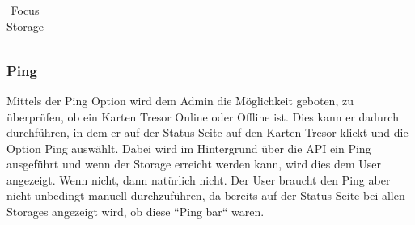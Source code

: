 \begin{table}[htbp]
\begin{tabular}{cc}
  \end{tabular}
  \label{tab:example}
  \captionsetup{type=figure}
  \caption{Focus Storage}
\end{table}

\newpage

\subsubsection{Ping} \label{subsubsec:ping}
Mittels der Ping Option wird dem Admin die Möglichkeit geboten, zu überprüfen, ob ein Karten Tresor Online oder Offline ist. Dies kann er dadurch durchführen, in dem er auf der Status-Seite auf den Karten Tresor klickt und die Option Ping auswählt. Dabei wird im Hintergrund über die API ein Ping ausgeführt und wenn der Storage erreicht werden kann, wird dies dem User angezeigt. Wenn nicht, dann natürlich nicht. Der User braucht den Ping aber nicht unbedingt manuell durchzuführen, da bereits auf der Status-Seite bei allen Storages angezeigt wird, ob diese ``Ping bar`` waren.

